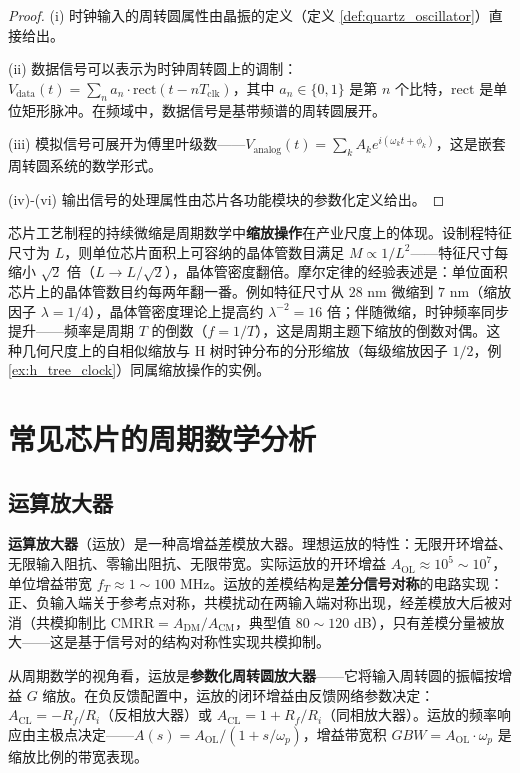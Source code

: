 \begin{proof}
(i) 时钟输入的周转圆属性由晶振的定义（定义 \ref{def:quartz_oscillator}）直接给出。

(ii) 数据信号可以表示为时钟周转圆上的调制：$V_{\text{data}}(t) = \sum_n a_n \cdot \text{rect}(t - nT_{\text{clk}})$，其中 $a_n \in \{0, 1\}$ 是第 $n$ 个比特，$\text{rect}$ 是单位矩形脉冲。在频域中，数据信号是基带频谱的周转圆展开。

(iii) 模拟信号可展开为傅里叶级数——$V_{\text{analog}}(t) = \sum_k A_k e^{i(\omega_k t + \phi_k)}$，这是嵌套周转圆系统的数学形式。

(iv)-(vi) 输出信号的处理属性由芯片各功能模块的参数化定义给出。
\end{proof}

\begin{definition}\label{ch24_moore_scaling}
芯片工艺制程的持续微缩是周期数学中\textbf{缩放操作}在产业尺度上的体现。设制程特征尺寸为 $L$，则单位芯片面积上可容纳的晶体管数目满足 $M \propto 1/L^2$——特征尺寸每缩小 $\sqrt{2}$ 倍（$L \to L/\sqrt{2}$），晶体管密度翻倍。摩尔定律的经验表述是：单位面积芯片上的晶体管数目约每两年翻一番。例如特征尺寸从 $28$ nm 微缩到 $7$ nm（缩放因子 $\lambda = 1/4$），晶体管密度理论上提高约 $\lambda^{-2} = 16$ 倍；伴随微缩，时钟频率同步提升——频率是周期 $T$ 的倒数（$f = 1/T$），这是周期主题下缩放的倒数对偶。这种几何尺度上的自相似缩放与 H 树时钟分布的分形缩放（每级缩放因子 $1/2$，例 \ref{ex:h_tree_clock}）同属缩放操作的实例。
\end{definition}

\section{常见芯片的周期数学分析}

\subsection{运算放大器}

\begin{definition}[运算放大器]\label{def:op_amp}
\textbf{运算放大器}（运放）是一种高增益差模放大器。理想运放的特性：无限开环增益、无限输入阻抗、零输出阻抗、无限带宽。实际运放的开环增益 $A_{\text{OL}} \approx 10^5 \sim 10^7$，单位增益带宽 $f_T \approx 1 \sim 100$ MHz。运放的差模结构是\textbf{差分信号对称}的电路实现：正、负输入端关于参考点对称，共模扰动在两输入端对称出现，经差模放大后被对消（共模抑制比 $\text{CMRR} = A_{\text{DM}}/A_{\text{CM}}$，典型值 $80 \sim 120$ dB），只有差模分量被放大——这是基于信号对的结构对称性实现共模抑制。

从周期数学的视角看，运放是\textbf{参数化周转圆放大器}——它将输入周转圆的振幅按增益 $G$ 缩放。在负反馈配置中，运放的闭环增益由反馈网络参数决定：$A_{\text{CL}} = -R_f/R_i$（反相放大器）或 $A_{\text{CL}} = 1 + R_f/R_i$（同相放大器）。运放的频率响应由主极点决定——$A(s) = A_{\text{OL}}/(1 + s/\omega_p)$，增益带宽积 $GBW = A_{\text{OL}} \cdot \omega_p$ 是缩放比例的带宽表现。
\end{definition}


